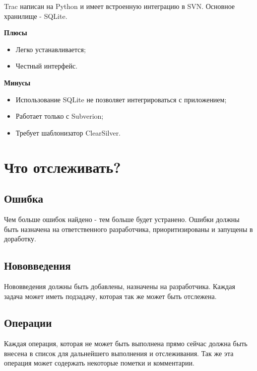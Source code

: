 Trac написан на Python и имеет встроенную интеграцию в SVN. Основное хранилище - SQLite.

\textbf{Плюсы}

\begin{itemize}

\item Легко устанавливается;

\item Честный интерфейс.

\end{itemize}

\textbf{Минусы}

\begin{itemize}

\item Использование SQLite не позволяет интегрироваться с приложением;

\item Работает только с Subverion;

\item Требует шаблонизатор ClearSilver.

\end{itemize}


\section{ Что отслеживать? } \label{sect3_17}

\subsection{ Ошибка } \label{sect3_17_1}

Чем больше ошибок найдено - тем больше будет устранено. Ошибки должны быть назначена на ответственного разработчика, приоритизированы и запущены в доработку.

\subsection{ Нововведения } \label{sect3_17_2}

Нововведения должны быть добавлены, назначены на разработчика. Каждая задача может иметь подзадачу, которая так же может быть отслежена.

\subsection{ Операции } \label{sect3_17_3}

Каждая операция, которая не может быть выполнена прямо сейчас должна быть внесена в список для дальнейшего выполнения и отслеживания. Так же эта операция может содержать некоторые пометки и комментарии.

